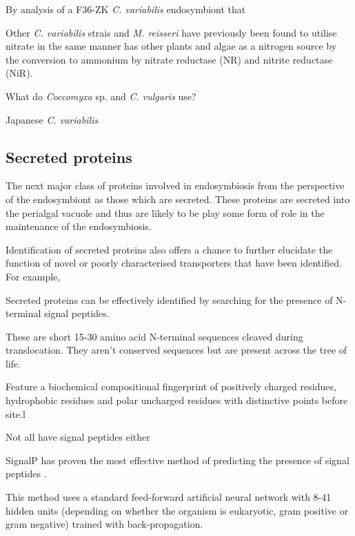 {{By analysis of a F36-ZK \textit{C. variabilis} \citep{Hoshina2010} endosymbiont
that 


Other \textit{C. variabilis} strais 
and \textit{M. reisseri} have previously been found to utilise nitrate 
in the same manner has other plants and algae as a nitrogen
source by the conversion to ammonium by nitrate reductase (NR)
and nitrite reductase (NiR).


What do \textit{Coccomyxa} sp. and \textit{C. vulgaris} use?



Japanese \textit{C. variabilis} 



\subsection{Secreted proteins}

The next major class of proteins involved in endosymbiosis
from the perspective of the endosymbiont as those
which are secreted.   These proteins are secreted
into the perialgal vacuole and thus are likely to
be play some form of role in the maintenance of
the endosymbiosis.


Identification of secreted proteins also offers
a chance to further elucidate the function of novel or poorly 
characterised transporters that have been identified. 
For example, 

Secreted proteins can be effectively identified by 
searching for the presence of N-terminal signal peptides. 

These are short 15-30 amino acid N-terminal sequences cleaved during translocation.
They aren't conserved sequences but are present across the tree of life.

Feature a biochemical compositional fingerprint 
of positively charged residues, hydrophobic residues and polar uncharged
residues with distinctive points before site.l \citep{Emanuelsson2007}





Not all have signal peptides either





SignalP \citep{Nielsen1997} has proven the most effective method of predicting
the presence of signal peptides \citep{Lee2009a,Petersen2011}.


This method uses a standard feed-forward artificial neural network
with 8-41 hidden units (depending on whether the organism is eukaryotic, 
gram positive or gram negative) trained with back-propagation.




}}
